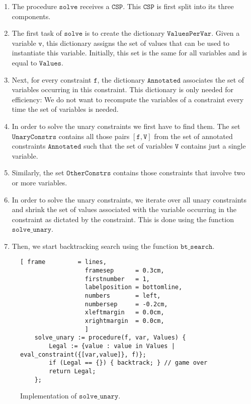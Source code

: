 \begin{enumerate}
\item The procedure $\texttt{solve}$ receives a $\texttt{CSP}$.  This $\texttt{CSP}$ is first split into its three components.
\item The first task of $\texttt{solve}$ is to create the dictionary $\texttt{ValuesPerVar}$.  
      Given a variable $\texttt{v}$, this dictionary assigns the set of values that can be used to instantiate this
      variable.  Initially, this set is the same for all variables and is equal to $\texttt{Values}$.
\item Next, for every constraint $\texttt{f}$, the dictionary $\texttt{Annotated}$ associates the set of
  variables occurring in this constraint.  This dictionary is only needed for efficiency:  
      We do not want to recompute the variables of a constraint every time the set of variables is needed.
\item In order to solve the unary constraints we first have to find them.
      The set $\texttt{UnaryConstrs}$ contains all those pairs $[\texttt{f}, \texttt{V}]$ from the set of
      annotated constraints $\texttt{Annotated}$ such that the set of variables $\texttt{V}$ contains just a
      single variable. 
\item Similarly, the set $\texttt{OtherConstrs}$ contains those constraints that involve two or more variables.
\item In order to solve the unary constraints, we iterate over all unary constraints and shrink the set of
      values associated with the variable occurring in the constraint as dictated by the constraint.
      This is done using the function $\texttt{solve\_unary}$.
\item Then, we start backtracking search using the function $\texttt{bt\_search}$.  
\end{enumerate}

\begin{figure}[!ht]
\centering
\begin{Verbatim}[ frame         = lines, 
                  framesep      = 0.3cm, 
                  firstnumber   = 1,
                  labelposition = bottomline,
                  numbers       = left,
                  numbersep     = -0.2cm,
                  xleftmargin   = 0.0cm,
                  xrightmargin  = 0.0cm,
                  ]
    solve_unary := procedure(f, var, Values) {
        Legal := {value : value in Values | eval_constraint({[var,value]}, f)};
        if (Legal == {}) { backtrack; } // game over
        return Legal;
    };
\end{Verbatim}
\vspace*{-0.3cm}
\caption{Implementation of $\texttt{solve\_unary}$.}
\label{fig:csp-constraint-propagation.stlx:solve_unary}
\end{figure}

